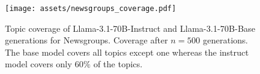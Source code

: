 \begin{figure}[t]
\vskip 0.2in
\begin{center}
\centerline{\texttt{[image: assets/newsgroups\_coverage.pdf]}}
\caption{Topic coverage of Llama-3.1-70B-Instruct and Llama-3.1-70B-Base generations for Newsgroups. Coverage after $n=500$ generations. The base model covers all topics except one whereas the instruct model covers only $60\%$ of the topics.}
\label{results-newsgroups-coverage}
\end{center}
\vskip -0.2in
\end{figure}
